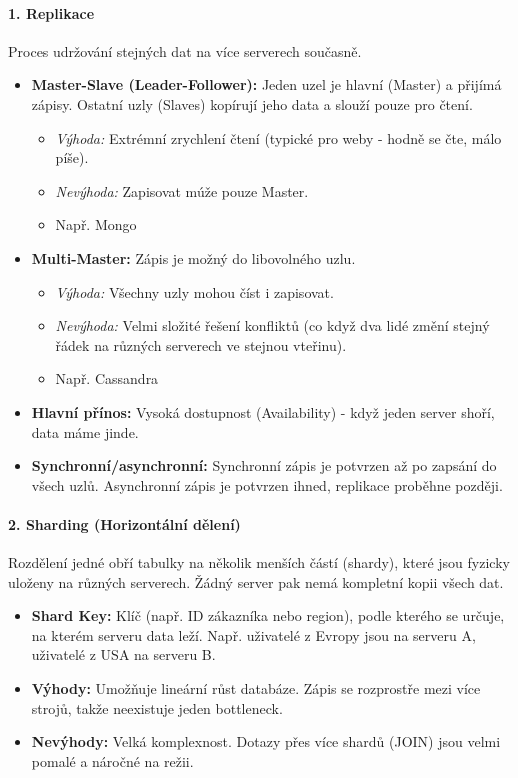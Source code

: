 \paragraph*{1. Replikace}
Proces udržování stejných dat na více serverech současně.
\begin{itemize}
    \item \textbf{Master-Slave (Leader-Follower):} Jeden uzel je hlavní (Master) a přijímá zápisy. Ostatní uzly (Slaves) kopírují jeho data a slouží pouze pro čtení. 
        \begin{itemize}
            \item \textit{Výhoda:} Extrémní zrychlení čtení (typické pro weby - hodně se čte, málo píše).
            \item \textit{Nevýhoda:} Zapisovat múže pouze Master.
            \item Např. Mongo
        \end{itemize}
    \item \textbf{Multi-Master:} Zápis je možný do libovolného uzlu. 
        \begin{itemize}
            \item \textit{Výhoda:} Všechny uzly mohou číst i zapisovat.
            \item \textit{Nevýhoda:} Velmi složité řešení konfliktů (co když dva lidé změní stejný řádek na různých serverech ve stejnou vteřinu).
            \item Např. Cassandra
        \end{itemize}
    \item \textbf{Hlavní přínos:} Vysoká dostupnost (Availability) - když jeden server shoří, data máme jinde.
    \item \textbf{Synchronní/asynchronní:} Synchronní zápis je potvrzen až po zapsání do všech uzlů. Asynchronní zápis je potvrzen ihned, replikace proběhne později.
\end{itemize}

\paragraph*{2. Sharding (Horizontální dělení)}
Rozdělení jedné obří tabulky na několik menších částí (shardy), které jsou fyzicky uloženy na různých serverech. Žádný server pak nemá kompletní kopii všech dat.
\begin{itemize}
    \item \textbf{Shard Key:} Klíč (např. ID zákazníka nebo region), podle kterého se určuje, na kterém serveru data leží. Např. uživatelé z Evropy jsou na serveru A, uživatelé z USA na serveru B.
    \item \textbf{Výhody:} Umožňuje lineární růst databáze. Zápis se rozprostře mezi více strojů, takže neexistuje jeden bottleneck.
    \item \textbf{Nevýhody:} Velká komplexnost. Dotazy přes více shardů (JOIN) jsou velmi pomalé a náročné na režii.
\end{itemize}

